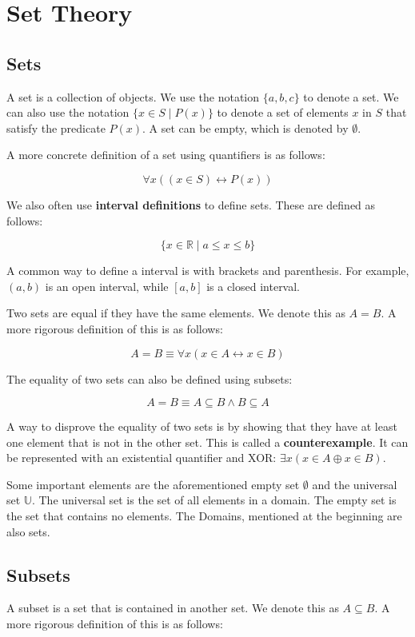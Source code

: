\documentclass[11pt]{article}
\begin{document}
\section{Set Theory}
\label{sec:org8aee17b}
\subsection{Sets}
\label{sec:orgcc69011}
A set is a collection of objects. We use the notation \(\{a,b,c\}\) to denote a set. We can also use the notation \(\{x \in S \mid P(x)\}\) to denote a set of elements \(x\) in \(S\) that satisfy the predicate \(P(x)\). A set can be empty, which is denoted by \(\emptyset\).

A more concrete definition of a set using quantifiers is as follows:

\[
\forall x (( x \in S) \leftrightarrow P(x))
\]

We also often use \textbf{interval definitions} to define sets. These are defined as follows:

\[
\{x \in \mathbb{R} \mid a \leq x \leq b\}
\]

A common way to define a interval is with brackets and parenthesis. For example, \((a,b)\) is an open interval, while \([a,b]\) is a closed interval.

Two sets are equal if they have the same elements. We denote this as \(A = B\). A more rigorous definition of this is as follows:

\[
A = B \equiv \forall x (x \in A \leftrightarrow x \in B)
\]

The equality of two sets can also be defined using subsets:

\[
A = B \equiv A \subseteq B \land B \subseteq A
\]

A way to disprove the equality of two sets is by showing that they have at least one element that is not in the other set. This is called a \textbf{counterexample}. It can be represented with an existential quantifier and XOR: \(\exists x (x \in A \oplus x \in B)\).

Some important elements are the aforementioned empty set \(\emptyset\) and the universal set \(\mathbb{U}\). The universal set is the set of all elements in a domain. The empty set is the set that contains no elements. The Domains, mentioned at the beginning are also sets.

\subsection{Subsets}
\label{sec:org34c89e4}
A subset is a set that is contained in another set. We denote this as \(A \subseteq B\). A more rigorous definition of this is as follows:
\end{document}
